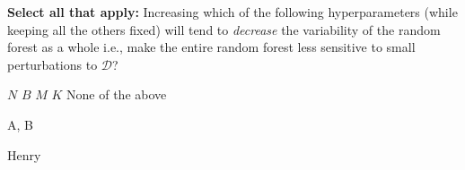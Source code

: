 \begin{parts}
    \textbf{Select all that apply:} Increasing which of the following hyperparameters (while keeping all the others fixed) will tend to \emph{decrease} the variability of the random forest as a whole i.e., make the entire random forest less sensitive to small perturbations to $\mathcal{D}$? 
        {%
        \checkboxchar{$\Box$} \checkedchar{$\blacksquare$} %
        \begin{checkboxes}
         \choice $N$
         \choice $B$
         \choice $M$
         \choice $K$
         \choice None of the above
        \end{checkboxes}
        }
        \begin{soln}
            A, B
        \end{soln}
    
    \begin{qauthor}
        Henry
    \end{qauthor}

\end{parts}

